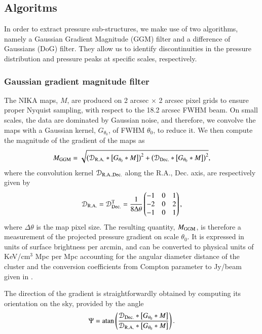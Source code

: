 \documentclass[twocolumn,traditabstract]{aa}
\begin{document}
\subsection{Algoritms}\label{sec:Algorithms}
In order to extract pressure sub-structures, we make use of two algorithms, namely a Gaussian Gradient Magnitude (GGM) filter and a difference of Gaussians (DoG) filter. They allow us to identify discontinuities in the pressure distribution and pressure peaks at specific scales, respectively.

\subsubsection{Gaussian gradient magnitude filter}
The NIKA maps, $M$, are produced on 2 arcsec $\times$ 2 arcsec pixel grids to ensure proper Nyquist sampling, with respect to the 18.2 arcsec FWHM beam. On small scales, the data are dominated by Gaussian noise, and therefore, we convolve the maps with a Gaussian kernel, $G_{\theta_0}$, of FWHM $\theta_0$, to reduce it. We then compute the magnitude of the gradient of the maps as 
\begin{equation}
	M_{\rm GGM} = \sqrt{\left(\mathcal{D}_{\rm R.A.} \ast \left[G_{\theta_0} \ast M\right]\right)^2 + \left(\mathcal{D}_{\rm Dec.} \ast \left[G_{\theta_0} \ast M\right]\right)^2},
	\label{eq:GGM_filter}
\end{equation}
where the convolution kernel $\mathcal{D}_{\rm R.A., Dec.}$ along the R.A., Dec. axis, are respectively given by
\begin{equation}
	\mathcal{D}_{\rm R.A.}= \mathcal{D}_{\rm Dec.}^{\rm T} = \frac{1}{8 \Delta \theta}
	\begin{pmatrix}
	-1 & 0 & 1\\
	-2 & 0 & 2\\
	-1 & 0 & 1
	\end{pmatrix},
	\label{eq:GGM_kernel}
\end{equation}
where $\Delta \theta$ is the map pixel size. The resulting quantity, $M_{\rm GGM}$, is therefore a measurement of the projected pressure gradient on scale $\theta_0$. It is expressed in units of surface brightness per arcmin, and can be converted to physical units of KeV/cm$^3$ Mpc per Mpc accounting for the angular diameter distance of the cluster and the conversion coefficients from Compton parameter to Jy/beam given in \cite{Adam2016b}.

The direction of the gradient is straightforwardly obtained by computing its orientation on the sky, provided by the angle
\begin{equation}
	\Psi = {\rm atan} \left( \frac{\mathcal{D}_{\rm Dec.} \ast \left[G_{\theta_0} \ast M\right]}{\mathcal{D}_{\rm R.A.} \ast \left[G_{\theta_0} \ast M\right]} \right).
	\label{eq:GGM_angle}
\end{equation}
\end{document}
